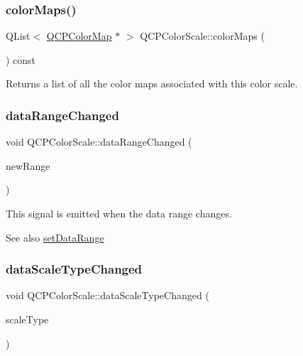 \subsubsection{\texorpdfstring{color\+Maps()}{colorMaps()}}
{\footnotesize\ttfamily Q\+List$<$ \mbox{\hyperlink{class_q_c_p_color_map}{Q\+C\+P\+Color\+Map}} $\ast$ $>$ Q\+C\+P\+Color\+Scale\+::color\+Maps (\begin{DoxyParamCaption}{ }\end{DoxyParamCaption}) const}

Returns a list of all the color maps associated with this color scale. \mbox{\label{class_q_c_p_color_scale_a293176da9447ec6819be1d901966a257}} 
\subsubsection{\texorpdfstring{data\+Range\+Changed}{dataRangeChanged}}
{\footnotesize\ttfamily void Q\+C\+P\+Color\+Scale\+::data\+Range\+Changed (\begin{DoxyParamCaption}\item[{\mbox{\hyperlink{class_q_c_p_range}{Q\+C\+P\+Range}}}]{new\+Range }\end{DoxyParamCaption})\hspace{0.3cm}{\ttfamily [signal]}}

This signal is emitted when the data range changes.

\begin{DoxySeeAlso}{See also}
\mbox{\hyperlink{class_q_c_p_color_scale_abe88633003a26d1e756aa74984587fef}{set\+Data\+Range}} 
\end{DoxySeeAlso}
\mbox{\label{class_q_c_p_color_scale_a61558b962f7791ff2f15a565dcf60181}} 
\subsubsection{\texorpdfstring{data\+Scale\+Type\+Changed}{dataScaleTypeChanged}}
{\footnotesize\ttfamily void Q\+C\+P\+Color\+Scale\+::data\+Scale\+Type\+Changed (\begin{DoxyParamCaption}\item[{\mbox{\hyperlink{class_q_c_p_axis_a36d8e8658dbaa179bf2aeb973db2d6f0}{Q\+C\+P\+Axis\+::\+Scale\+Type}}}]{scale\+Type }\end{DoxyParamCaption})\hspace{0.3cm}{\ttfamily [signal]}}

